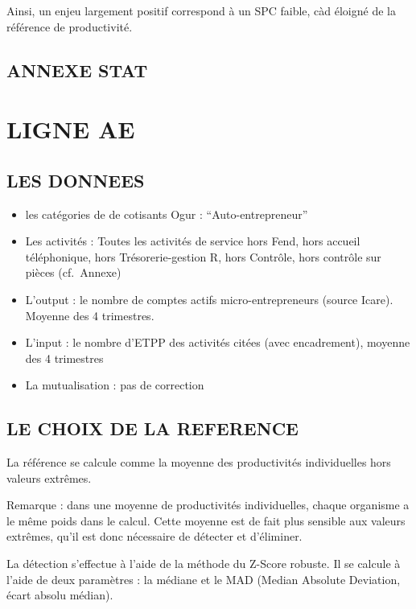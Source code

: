 \documentclass[
]{book}
\begin{document}
Ainsi, un enjeu largement positif correspond à un SPC faible, càd éloigné de la référence de productivité.

\hypertarget{annexe-stat}{%
\section{ANNEXE STAT}\label{annexe-stat}}

\hypertarget{ligne-ae}{%
\chapter{LIGNE AE}\label{ligne-ae}}

\hypertarget{les-donnees-6}{%
\section{LES DONNEES}\label{les-donnees-6}}

\begin{itemize}
\item
  les catégories de de cotisants Ogur : ``Auto-entrepreneur''
\item
  Les activités :
  Toutes les activités de service hors Fend, hors accueil téléphonique, hors Trésorerie-gestion R, hors Contrôle, hors contrôle sur pièces (cf.~Annexe)
\item
  L'output : le nombre de comptes actifs micro-entrepreneurs (source Icare). Moyenne des 4 trimestres.
\item
  L'input : le nombre d'ETPP des activités citées (avec encadrement), moyenne des 4 trimestres
\item
  La mutualisation : pas de correction
\end{itemize}

\hypertarget{le-choix-de-la-reference-2}{%
\section{LE CHOIX DE LA REFERENCE}\label{le-choix-de-la-reference-2}}

La référence se calcule comme la moyenne des productivités individuelles hors valeurs extrêmes.

Remarque : dans une moyenne de productivités individuelles, chaque organisme a le même poids dans le calcul. Cette moyenne est de fait plus sensible aux valeurs extrêmes, qu'il est donc nécessaire de détecter et d'éliminer.

La détection s'effectue à l'aide de la méthode du Z-Score robuste.
Il se calcule à l'aide de deux paramètres : la médiane et le MAD (Median Absolute Deviation, écart absolu médian).
\end{document}

